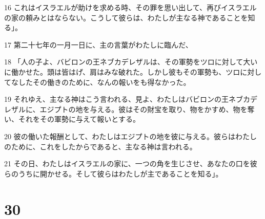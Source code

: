 \par 16 これはイスラエルが助けを求める時、その罪を思い出して、再びイスラエルの家の頼みとはならない。こうして彼らは、わたしが主なる神であることを知る」。
\par 17 第二十七年の一月一日に、主の言葉がわたしに臨んだ、
\par 18 「人の子よ、バビロンの王ネブカデレザルは、その軍勢をツロに対して大いに働かせた。頭は皆はげ、肩はみな破れた。しかし彼もその軍勢も、ツロに対してなしたその働きのために、なんの報いをも得なかった。
\par 19 それゆえ、主なる神はこう言われる、見よ、わたしはバビロンの王ネブカデレザルに、エジプトの地を与える。彼はその財宝を取り、物をかすめ、物を奪い、それをその軍勢に与えて報いとする。
\par 20 彼の働いた報酬として、わたしはエジプトの地を彼に与える。彼らはわたしのために、これをしたからであると、主なる神は言われる。
\par 21 その日、わたしはイスラエルの家に、一つの角を生じさせ、あなたの口を彼らのうちに開かせる。そして彼らはわたしが主であることを知る」。

\chapter{30}

